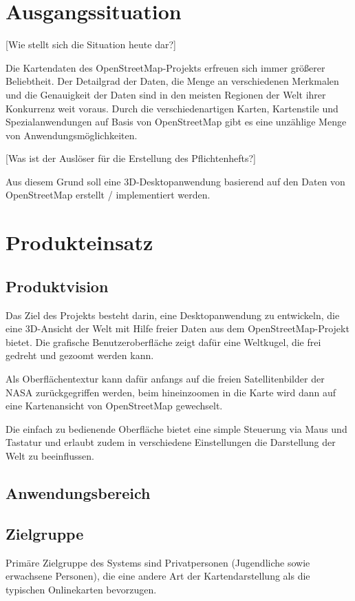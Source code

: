 \documentclass[10pt]{scrreprt}
\begin{document}
\rmfamily
\tableofcontents



\chapter{Ausgangssituation}
[Wie stellt sich die Situation heute dar?]

Die Kartendaten des OpenStreetMap-Projekts erfreuen sich immer größerer Beliebtheit. Der Detailgrad der Daten, die Menge an verschiedenen Merkmalen und die Genauigkeit der Daten sind in den meisten Regionen der Welt ihrer Konkurrenz weit voraus. Durch die verschiedenartigen Karten, Kartenstile und Spezialanwendungen auf Basis von OpenStreetMap gibt es eine unzählige Menge von Anwendungsmöglichkeiten.


[Was ist der Auslöser für die Erstellung des Pflichtenhefts?]

Aus diesem Grund soll eine 3D-Desktopanwendung basierend auf den Daten von OpenStreetMap erstellt / implementiert werden.




\chapter{Produkteinsatz}
\section{Produktvision}
Das Ziel des Projekts besteht darin, eine Desktopanwendung zu entwickeln, die eine 3D-Ansicht der Welt mit Hilfe freier Daten aus dem OpenStreetMap-Projekt bietet. Die grafische Benutzeroberfläche zeigt dafür eine Weltkugel, die frei gedreht und gezoomt werden kann. 

Als Oberflächentextur kann dafür anfangs auf die freien Satellitenbilder der
NASA zurückgegriffen werden, beim hineinzoomen in die Karte wird dann auf eine Kartenansicht von OpenStreetMap gewechselt.

Die einfach zu bedienende Oberfläche bietet eine simple Steuerung via Maus und Tastatur und erlaubt zudem in verschiedene Einstellungen die Darstellung der Welt zu beeinflussen. 


\section{Anwendungsbereich}


\section{Zielgruppe}
Primäre Zielgruppe des Systems sind Privatpersonen (Jugendliche sowie erwachsene Personen), die eine andere Art der Kartendarstellung als die typischen Onlinekarten bevorzugen.
\end{document}

